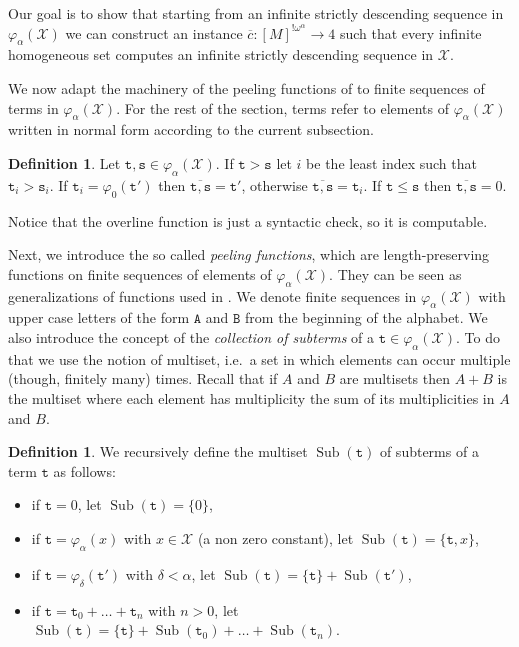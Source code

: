 \documentclass[11pt]{amsart}
\theoremstyle{definition}
\newtheorem{definition}[thm]{Definition}
\theoremstyle{remark}
\theoremstyle{plain}
\newcommand{\Sub}{\operatorname{Sub}}
\def\X{\mathcal{X}}
\def\om{\omega}
\def\a{\alpha}
\def\d{\delta}
\newcommand{\lorenzo}[1]{\textcolor{blue}{#1}}
\newcommand{\andrea}[1]{\textcolor{green}{#1}}
\begin{document}


Our goal is to show that starting from an infinite strictly descending sequence in $\varphi_\a(\X)$ we can construct an instance $\overline{c} \colon [M]^{! \om^\a} \to 4$ such that every infinite homogeneous set computes an infinite strictly descending sequence in $\X$.

We now adapt the machinery of the peeling functions of \cite{marcone2025} to finite sequences of terms in $\varphi_\a(\X)$.
For the rest of the section, terms refer to elements of $\varphi_\a(\X)$ written in normal form according to the current subsection.

\begin{definition}\label{overline def}
Let $\mathtt{t},\mathtt{s} \in \varphi_\a (\X)$.
If $\mathtt{t} > \mathtt{s}$ let $i$ be the least index such that $\mathtt{t}_i > \mathtt{s}_i$.
If $\mathtt{t}_i = \varphi_0(\mathtt{t}')$ then $\overline{\mathtt{t},\mathtt{s}} = \mathtt{t}'$, otherwise $\overline{\mathtt{t},\mathtt{s}} = \mathtt{t}_i$.
If $\mathtt{t} \le \mathtt{s}$ then $\overline{\mathtt{t},\mathtt{s}} = 0$.
\end{definition}

Notice that the overline function is just a syntactic check, so it is computable.
		
Next, we introduce the so called \textit{peeling functions}, which are length-preserving functions on finite sequences of elements of $\varphi_\a(\X)$.
They can be seen as generalizations of functions used in \cite{Loe-Nes:92,carlucci2025}.
We denote finite sequences in $\varphi_\a(\X)$ with upper case letters of the form $\mathtt{A}$ and $\mathtt{B}$ from the beginning of the alphabet.
We also introduce the concept of the {\em collection of subterms} of a $\mathtt{t} \in \varphi_\a(\X)$.
To do that we use the notion of multiset, i.e.\ a set in which elements can occur multiple (though, finitely many) times.
Recall that if $A$ and $B$ are multisets then $A+B$ is the multiset where each element has multiplicity the sum of its multiplicities in $A$ and $B$.

\begin{definition}
We recursively define the multiset $\Sub (\mathtt{t})$ of subterms of a term $\mathtt{t}$ as follows:
\begin{itemize}
    \item if $\mathtt{t} = 0$, let $\Sub(\mathtt{t}) = \{0\}$,
    \item if $\mathtt{t} = \varphi_\a(x)$ with $x \in \X$ (a non zero constant), let $\Sub(\mathtt{t}) = \{\mathtt{t},x\}$,
    \item if $\mathtt{t} = \varphi_\d (\mathtt{t}')$ with $\d < \a$, let $\Sub(\mathtt{t}) = \{\mathtt{t}\} + \Sub(\mathtt{t}')$,
    \item if $\mathtt{t} = \mathtt{t}_0 + \ldots + \mathtt{t}_n$ with $n > 0$, let $\Sub(\mathtt{t}) = \{\mathtt{t}\} + \Sub(\mathtt{t}_0) + \ldots + \Sub(\mathtt{t}_n)$.
\end{itemize}
\end{definition}
\end{document}
